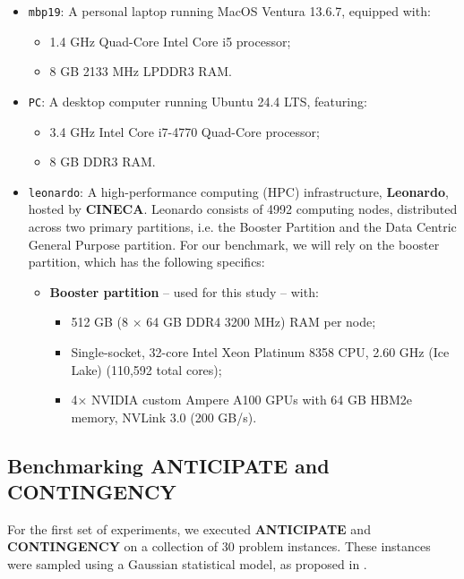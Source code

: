 \documentclass[a4paper,singleside,12pt]{report} %
\begin{document}
\begin{itemize}
    \item \verb|mbp19|: A personal laptop running MacOS Ventura 13.6.7, equipped with:
    \begin{itemize}
        \item 1.4 GHz Quad-Core Intel Core i5 processor;
        \item 8 GB 2133 MHz LPDDR3 RAM.
    \end{itemize}
    
    \item \verb|PC|: A desktop computer running Ubuntu 24.4 LTS, featuring:
    \begin{itemize}
        \item 3.4 GHz Intel Core i7-4770 Quad-Core processor;
        \item 8 GB DDR3 RAM.
    \end{itemize}
    
    \item \verb|leonardo|: A high-performance computing (HPC) infrastructure, \textbf{Leonardo}, hosted by \textbf{CINECA}. Leonardo consists of 4992 computing nodes, distributed across 
    two primary partitions, i.e. the Booster Partition and the Data Centric General Purpose partition. For our benchmark, we will rely on the booster partition, which has the following 
    specifics:
    \begin{itemize}
        \item \textbf{Booster partition} – used for this study – with:
        \begin{itemize}
            \item 512 GB (8 × 64 GB DDR4 3200 MHz) RAM per node;
            \item Single-socket, 32-core Intel Xeon Platinum 8358 CPU, 2.60 GHz (Ice Lake) (110,592 total cores);
            \item 4× NVIDIA custom Ampere A100 GPUs with 64 GB HBM2e memory, NVLink 3.0 (200 GB/s).
        \end{itemize}
    \end{itemize}
\end{itemize}

\subsection{Benchmarking ANTICIPATE and CONTINGENCY}

For the first set of experiments, we executed \textbf{ANTICIPATE} and \textbf{CONTINGENCY} on a collection of 30 problem instances. These instances were sampled using a Gaussian statistical 
model, as proposed in \cite{DEFILIPPO2022109199}. 
\end{document}
